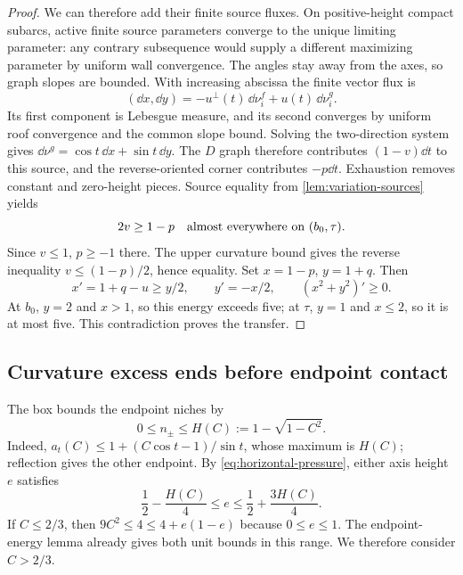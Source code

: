\begin{proof}
We can therefore add their finite source fluxes. On positive-height
compact subarcs, active finite source parameters converge to the
unique limiting parameter: any contrary subsequence would supply
a different maximizing parameter by uniform wall convergence.
The angles stay away from the axes, so graph slopes are bounded.
With increasing abscissa the finite vector flux is
\[
 (\dd x,\dd y)=-u^\perp(t)\,\dd\nu_i^f
                         +u(t)\,\dd\nu_i^g.
\]
Its first component is Lebesgue measure, and its second converges
by uniform roof convergence and the common slope bound.
Solving the two-direction system gives
$\dd\nu^g=\cos t\,\dd x+\sin t\,\dd y$.
The $D$ graph therefore contributes $(1-v)\dd t$ to this source,
and the reverse-oriented corner contributes $-p\dd t$.
Exhaustion removes constant and zero-height pieces.
Source equality from \cref{lem:variation-sources} yields
\[
 2v\ge1-p\quad\hbox{almost everywhere on }(b_0,\tau).
\]
Since $v\le1$, $p\ge-1$ there. The upper curvature bound gives
the reverse inequality $v\le(1-p)/2$, hence equality.
Set $x=1-p$, $y=1+q$. Then
\[
 x'=1+q-u\ge y/2,\qquad y'=-x/2,\qquad
 (x^2+y^2)'\ge0.
\]
At $b_0$, $y=2$ and $x>1$, so this energy exceeds five;
at $\tau$, $y=1$ and $x\le2$, so it is at most five.
This contradiction proves the transfer.
\end{proof}

\subsection{Curvature excess ends before endpoint contact}

The box bounds the endpoint niches by
\[
 0\le n_\pm\le H(C):=1-\sqrt{1-C^2}.
\]
Indeed, $a_t(C)\le1+(C\cos t-1)/\sin t$, whose maximum
is $H(C)$; reflection gives the other endpoint.
By \eqref{eq:horizontal-pressure}, either axis height $e$ satisfies
\begin{equation}\label{eq:horizontal-box-pressure}
 \frac12-\frac{H(C)}4\le e\le\frac12+\frac{3H(C)}4.
\end{equation}
If $C\le2/3$, then $9C^2\le4\le4+e(1-e)$ because
$0\le e\le1$. The endpoint-energy lemma already gives both unit
bounds in this range. We therefore consider $C>2/3$.


